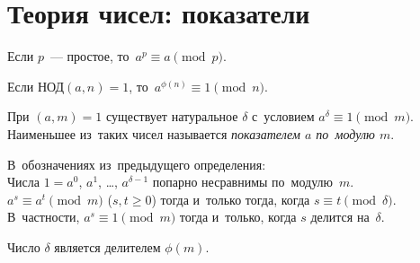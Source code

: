 \section*{Теория чисел: показатели}



\begingroup\providecommand\ifincludesolutions{\iffalse}

\ifincludesolutions
\subsection*{Версия с решениями}
\fi

Если $p$~--- простое, то~$a^p \equiv a \pmod{p}$.

Если $\text{НОД}(a, n) = 1$, то~$a^{\phi(n)} \equiv 1 \pmod{n}$.

При $(a, m) = 1$ существует натуральное $\delta$ с~условием
$a^{\delta} \equiv 1 \pmod{m}$.
Наименьшее из~таких чисел называется \emph{показателем $a$ по~модулю $m$}.

\begin{problems}

\item
В~обозначениях из~предыдущего определения:
\\
\subproblem
Числа $1 = a^0$, $a^1$, \ldots, $a^{\delta-1}$ попарно несравнимы
по~модулю~$m$.
\\
\subproblem
$a^s \equiv a^t \pmod{m}$ ($s, t \geq 0$)
тогда и~только тогда, когда
$s \equiv t \pmod{\delta}$.
В~частности, $a^s \equiv 1 \pmod{m}$
тогда и~только, когда
$s$ делится на~$\delta$.
\\
\subproblem
\ifincludesolutions\label{extra/algebra:phi:problem}\fi
Число $\delta$ является делителем $\phi(m)$.

\end{problems}

\ifincludesolutions
\setcounter{jeolmsubproblem}{0}%
\subproblem
Пусть $a^s \equiv a^t \pmod{m}$.
Тогда $a^{t} (a^{s-t} - 1)$ делится на~$m$.
То есть $(a^{s-t} - 1)$ делится на~$m$.
Но~такого быть не~может, поскольку $0 < s - t < \delta$.
\par
\subproblem
Сначала докажем, что $a^s \equiv 1 \pmod{m}$ тогда и только тогда, когда
$s$ делится на~$\delta$.
Пусть это не~так.
Тогда $s = x \delta + r$.
Имеем, $1 \equiv a^s \equiv (a^{\delta})^x a^r \equiv a^r \pmod{m}$.
Но~такого быть не~может из~определения показателя.
Значит, $r = 0$ и~$s$ делится на~$\delta$ без остатка.
Отсюда сразу следует, что если $a^s \equiv a^t \pmod{m}$, то~$(a^{s-t} - 1)$
делится на~$m$, то~есть $(s - t)$ делится на~$\delta$.
\par
\subproblem
Очевидное следствие из~теоремы Эйлера и~предыдущего пункта.
\fi %

